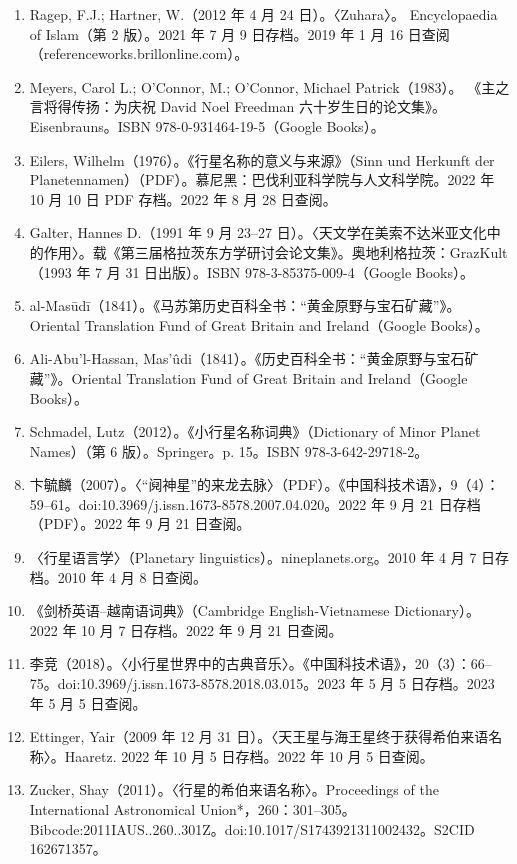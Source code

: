\begin{enumerate}
\item Ragep, F.J.; Hartner, W.（2012 年 4 月 24 日）。〈Zuhara〉。
Encyclopaedia of Islam（第 2 版）。2021 年 7 月 9 日存档。2019 年 1 月 16 日查阅（referenceworks.brillonline.com）。
\item Meyers, Carol L.; O'Connor, M.; O'Connor, Michael Patrick（1983）。
《主之言将得传扬：为庆祝 David Noel Freedman 六十岁生日的论文集》。Eisenbrauns。ISBN 978-0-931464-19-5（Google Books）。
\item Eilers, Wilhelm（1976）。《行星名称的意义与来源》（Sinn und Herkunft der Planetennamen）（PDF）。慕尼黑：巴伐利亚科学院与人文科学院。2022 年 10 月 10 日 PDF 存档。2022 年 8 月 28 日查阅。
\item Galter, Hannes D.（1991 年 9 月 23–27 日）。〈天文学在美索不达米亚文化中的作用〉。载《第三届格拉茨东方学研讨会论文集》。奥地利格拉茨：GrazKult（1993 年 7 月 31 日出版）。ISBN 978-3-85375-009-4（Google Books）。
\item al-Masūdī（1841）。《马苏第历史百科全书：“黄金原野与宝石矿藏”》。Oriental Translation Fund of Great Britain and Ireland（Google Books）。
\item Ali-Abu'l-Hassan, Mas'ûdi（1841）。《历史百科全书：“黄金原野与宝石矿藏”》。Oriental Translation Fund of Great Britain and Ireland（Google Books）。
\item Schmadel, Lutz（2012）。《小行星名称词典》（Dictionary of Minor Planet Names）（第 6 版）。Springer。p. 15。ISBN 978-3-642-29718-2。
\item 卞毓麟（2007）。〈“阋神星”的来龙去脉〉（PDF）。《中国科技术语》，9（4）：59–61。doi:10.3969/j.issn.1673-8578.2007.04.020。2022 年 9 月 21 日存档（PDF）。2022 年 9 月 21 日查阅。
\item 〈行星语言学〉（Planetary linguistics）。nineplanets.org。2010 年 4 月 7 日存档。2010 年 4 月 8 日查阅。
\item 《剑桥英语–越南语词典》（Cambridge English-Vietnamese Dictionary）。
2022 年 10 月 7 日存档。2022 年 9 月 21 日查阅。
\item 李竞（2018）。〈小行星世界中的古典音乐〉。《中国科技术语》，20（3）：66–75。doi:10.3969/j.issn.1673-8578.2018.03.015。2023 年 5 月 5 日存档。2023 年 5 月 5 日查阅。
\item Ettinger, Yair（2009 年 12 月 31 日）。〈天王星与海王星终于获得希伯来语名称〉。Haaretz. 2022 年 10 月 5 日存档。2022 年 10 月 5 日查阅。
\item Zucker, Shay（2011）。〈行星的希伯来语名称〉。Proceedings of the International Astronomical Union*，260：301–305。Bibcode:2011IAUS..260..301Z。doi:10.1017/S1743921311002432。S2CID 162671357。

\end{enumerate}
